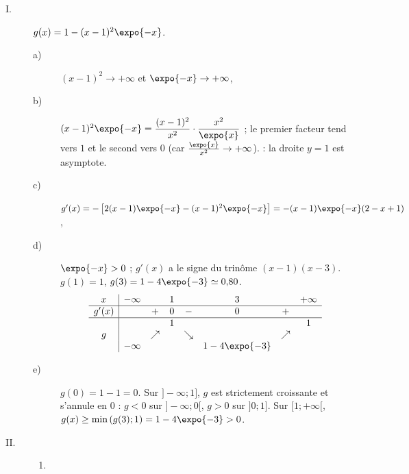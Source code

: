 \begin{description}
   \item[I.] $g(x) = 1 - (x - 1)^2\expo{-x}$.
      \begin{description}
         \item[a)] 
            $(x - 1)^2 \to +\infty$ et $\expo{-x} \to +\infty$, 
         \item[b)] 
            $(x - 1)^2\expo{-x} = \dfrac{(x-1)^2}{x^2}\cdot\dfrac{x^2}{\expo{x}}$ ; le premier facteur tend vers $1$ et le second vers $0$
            (car $\frac{\expo{x}}{x^2} \to +\infty$).  : la droite $y = 1$ est asymptote.
         \item[c)] 
            $g'(x) = -\left[2(x - 1)\expo{-x} - (x - 1)^2\expo{-x}\right] = -(x - 1)\expo{-x}(2 - x + 1)$,
            \par\noindent{}
         \item[d)] 
            $\expo{-x} > 0$ ; $g'(x)$ a le signe du trin\^ome $(x - 1)(x - 3)$. $g(1) = 1$, $g(3) = 1 - 4\expo{-3} \simeq 0{,}80$.
            \[
               \begin{array}{c|ccccccc}
                  x & -\infty & & 1 & & 3 & & +\infty \\ \hline
                  g'(x) & & + & 0 & - & 0 & + & \\ \hline
                  & & & 1 & & & & 1 \\
                  g & & \nearrow & & \searrow & & \nearrow & \\
                  & -\infty & & & & 1 - 4\expo{-3} & &
               \end{array}
            \]
         \item[e)] 
            $g(0) = 1 - 1 = 0$. Sur $]-\infty ; 1]$, $g$ est strictement croissante et s'annule en $0$ : $g < 0$ sur $]-\infty ; 0[$,
            $g > 0$ sur $]0 ; 1]$. Sur $[1 ; +\infty[$, $g(x) \geq \min\left(g(3) ; 1\right) = 1 - 4\expo{-3} > 0$.
            \par\noindent{}
      \end{description}
   \item[II.]
      \begin{enumerate}
         \item

\end{enumerate}
\end{description}
